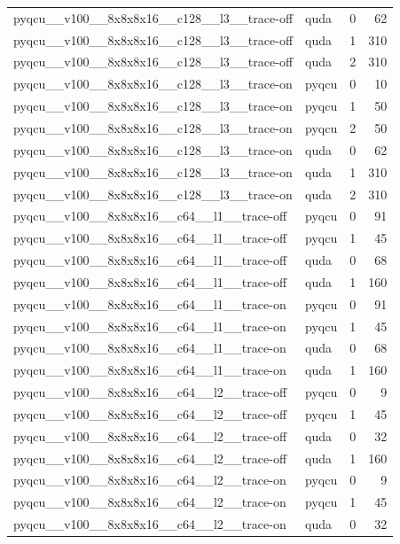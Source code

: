 \begin{table}[htbp]
\begin{tabular}{@{}llrr@{}}
pyqcu\_\_v100\_\_8x8x8x16\_\_c128\_\_l3\_\_trace-off & quda & 0 & 62 \\
pyqcu\_\_v100\_\_8x8x8x16\_\_c128\_\_l3\_\_trace-off & quda & 1 & 310 \\
pyqcu\_\_v100\_\_8x8x8x16\_\_c128\_\_l3\_\_trace-off & quda & 2 & 310 \\
pyqcu\_\_v100\_\_8x8x8x16\_\_c128\_\_l3\_\_trace-on & pyqcu & 0 & 10 \\
pyqcu\_\_v100\_\_8x8x8x16\_\_c128\_\_l3\_\_trace-on & pyqcu & 1 & 50 \\
pyqcu\_\_v100\_\_8x8x8x16\_\_c128\_\_l3\_\_trace-on & pyqcu & 2 & 50 \\
pyqcu\_\_v100\_\_8x8x8x16\_\_c128\_\_l3\_\_trace-on & quda & 0 & 62 \\
pyqcu\_\_v100\_\_8x8x8x16\_\_c128\_\_l3\_\_trace-on & quda & 1 & 310 \\
pyqcu\_\_v100\_\_8x8x8x16\_\_c128\_\_l3\_\_trace-on & quda & 2 & 310 \\
pyqcu\_\_v100\_\_8x8x8x16\_\_c64\_\_l1\_\_trace-off & pyqcu & 0 & 91 \\
pyqcu\_\_v100\_\_8x8x8x16\_\_c64\_\_l1\_\_trace-off & pyqcu & 1 & 45 \\
pyqcu\_\_v100\_\_8x8x8x16\_\_c64\_\_l1\_\_trace-off & quda & 0 & 68 \\
pyqcu\_\_v100\_\_8x8x8x16\_\_c64\_\_l1\_\_trace-off & quda & 1 & 160 \\
pyqcu\_\_v100\_\_8x8x8x16\_\_c64\_\_l1\_\_trace-on & pyqcu & 0 & 91 \\
pyqcu\_\_v100\_\_8x8x8x16\_\_c64\_\_l1\_\_trace-on & pyqcu & 1 & 45 \\
pyqcu\_\_v100\_\_8x8x8x16\_\_c64\_\_l1\_\_trace-on & quda & 0 & 68 \\
pyqcu\_\_v100\_\_8x8x8x16\_\_c64\_\_l1\_\_trace-on & quda & 1 & 160 \\
pyqcu\_\_v100\_\_8x8x8x16\_\_c64\_\_l2\_\_trace-off & pyqcu & 0 & 9 \\
pyqcu\_\_v100\_\_8x8x8x16\_\_c64\_\_l2\_\_trace-off & pyqcu & 1 & 45 \\
pyqcu\_\_v100\_\_8x8x8x16\_\_c64\_\_l2\_\_trace-off & quda & 0 & 32 \\
pyqcu\_\_v100\_\_8x8x8x16\_\_c64\_\_l2\_\_trace-off & quda & 1 & 160 \\
pyqcu\_\_v100\_\_8x8x8x16\_\_c64\_\_l2\_\_trace-on & pyqcu & 0 & 9 \\
pyqcu\_\_v100\_\_8x8x8x16\_\_c64\_\_l2\_\_trace-on & pyqcu & 1 & 45 \\
pyqcu\_\_v100\_\_8x8x8x16\_\_c64\_\_l2\_\_trace-on & quda & 0 & 32 \\

\end{tabular}
\end{table}
